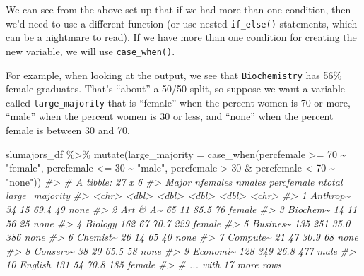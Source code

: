 \documentclass[
]{book}
\newenvironment{Shaded}{\begin{snugshade}}{\end{snugshade}}
\newcommand{\AttributeTok}[1]{\textcolor[rgb]{0.77,0.63,0.00}{#1}}
\newcommand{\CommentTok}[1]{\textcolor[rgb]{0.56,0.35,0.01}{\textit{#1}}}
\newcommand{\DecValTok}[1]{\textcolor[rgb]{0.00,0.00,0.81}{#1}}
\newcommand{\FunctionTok}[1]{\textcolor[rgb]{0.00,0.00,0.00}{#1}}
\newcommand{\NormalTok}[1]{#1}
\newcommand{\SpecialCharTok}[1]{\textcolor[rgb]{0.00,0.00,0.00}{#1}}
\newcommand{\StringTok}[1]{\textcolor[rgb]{0.31,0.60,0.02}{#1}}
\begin{document}
We can see from the above set up that if we had more than one condition, then we'd need to use a different function (or use nested \texttt{if\_else()} statements, which can be a nightmare to read). If we have more than one condition for creating the new variable, we will use \texttt{case\_when()}.

For example, when looking at the output, we see that \texttt{Biochemistry} has 56\% female graduates. That's ``about'' a 50/50 split, so suppose we want a variable called \texttt{large\_majority} that is ``female'' when the percent women is 70 or more, ``male'' when the percent women is 30 or less, and ``none'' when the percent female is between 30 and 70.

\begin{Shaded}
\begin{Highlighting}[]
\NormalTok{slumajors\_df }\SpecialCharTok{\%\textgreater{}\%} \FunctionTok{mutate}\NormalTok{(}\AttributeTok{large\_majority =}
                          \FunctionTok{case\_when}\NormalTok{(percfemale }\SpecialCharTok{\textgreater{}=} \DecValTok{70} \SpecialCharTok{\textasciitilde{}} \StringTok{"female"}\NormalTok{,}
\NormalTok{                                    percfemale }\SpecialCharTok{\textless{}=} \DecValTok{30} \SpecialCharTok{\textasciitilde{}} \StringTok{"male"}\NormalTok{,}
\NormalTok{                                    percfemale }\SpecialCharTok{\textgreater{}} \DecValTok{30} \SpecialCharTok{\&}\NormalTok{ percfemale }\SpecialCharTok{\textless{}} \DecValTok{70} \SpecialCharTok{\textasciitilde{}} \StringTok{"none"}\NormalTok{)) }
\CommentTok{\#\textgreater{} \# A tibble: 27 x 6}
\CommentTok{\#\textgreater{}    Major    nfemales nmales percfemale ntotal large\_majority}
\CommentTok{\#\textgreater{}    \textless{}chr\textgreater{}       \textless{}dbl\textgreater{}  \textless{}dbl\textgreater{}      \textless{}dbl\textgreater{}  \textless{}dbl\textgreater{} \textless{}chr\textgreater{}         }
\CommentTok{\#\textgreater{}  1 Anthrop\textasciitilde{}       34     15       69.4     49 none          }
\CommentTok{\#\textgreater{}  2 Art \& A\textasciitilde{}       65     11       85.5     76 female        }
\CommentTok{\#\textgreater{}  3 Biochem\textasciitilde{}       14     11       56       25 none          }
\CommentTok{\#\textgreater{}  4 Biology       162     67       70.7    229 female        }
\CommentTok{\#\textgreater{}  5 Busines\textasciitilde{}      135    251       35.0    386 none          }
\CommentTok{\#\textgreater{}  6 Chemist\textasciitilde{}       26     14       65       40 none          }
\CommentTok{\#\textgreater{}  7 Compute\textasciitilde{}       21     47       30.9     68 none          }
\CommentTok{\#\textgreater{}  8 Conserv\textasciitilde{}       38     20       65.5     58 none          }
\CommentTok{\#\textgreater{}  9 Economi\textasciitilde{}      128    349       26.8    477 male          }
\CommentTok{\#\textgreater{} 10 English       131     54       70.8    185 female        }
\CommentTok{\#\textgreater{} \# ... with 17 more rows}
\end{Highlighting}
\end{Shaded}
\end{document}
